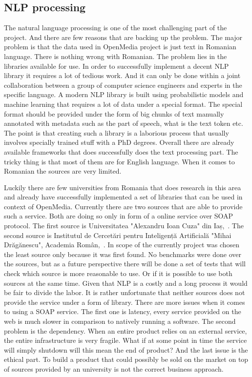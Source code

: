 


\subsection{NLP processing}
The natural language processing is one of the most challenging part of the project. And there are few reasons that are backing up the problem. The major problem is that the data used in OpenMedia project is just text in Romanian language. There is nothing wrong with Romanian. The problem lies in the libraries available for use. In order to successfully implement a decent NLP library it requires a lot of tedious work. And it can only be done within a joint collaboration between a group of computer science engineers and experts in the specific language. A modern NLP library is built using probabilistic models and machine learning that requires a lot of data under a special format. The special format should be provided under the form of big chunks of text manually annotated with metadata such as the part of speech, what is the text token etc. The point is that creating such a library is a laborious process that usually involves specially trained stuff with a PhD degrees. Overall there are already available frameworks that does successfully does the text processing part. The tricky thing is that most of them are for English language. When it comes to Romanian the sources are very limited.

Luckily there are few universities from Romania that does research in this area and already have successfully implemented a set of libraries that can be used in context of OpenMedia. Currently there are two sources that are able to provide such a service. Both are doing so only in form of a online service over SOAP protocol. The first source is Universitatea "Alexandru Ioan Cuza" din \mbox{Iaș, \cite{uaic}}. The second source is Institutul de Cercetări pentru Inteligență Artificială "Mihai Drăgănescu", Academia \mbox{Român, \cite{racai}}. In scope of the currently project was chosen the least source only because it was first found. No benchmarks were done over the sources, but as a future perspective there will be done a set of tests that will check which source is more reasonable to use. Or if it is possible to use both sources at the same time. Given that NLP is a costly and a long process it would be fair to divide the labor. It is rather unfortunate that neither sources does not provide the service under a form of library. There are more issues when it comes to using a SOAP service. The first one is latency, every service provided on the web is much slower in comparison to natively running a software. The second problem is the dependency. When an entire product relies on an external service, the entire infrastructure is very fragile. What if at some point in time the service will simply shutdown will this mean the end of product? And the last issue is the ethical part. To build a product that could possibly be sold on the market on top of sources provided by an university is not the correct business approach.

